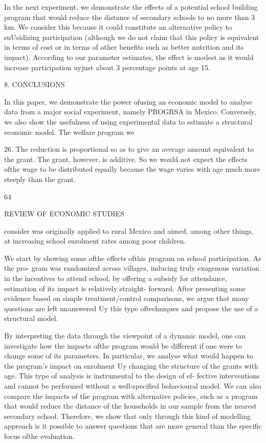 In the next experiment, we demonstrate the effects of a potential school building program that would reduce the distance of secondary schools to no more than 3 km. We consider this because it could constitute an alternative policy to suUsidizing participation (although we do not claim that this policy is equivalent in terms of cost or in terms of other benefits such as better nutrition and its impact). According to our parameter estimates, the effect is modest as it would increase participation uyjust about 3 percentage points at age 15.

8. CONCLUSIONS

In this paper, we demonstrate the power ofusing an economic model to analyse data from a major social experiment, namely PROGRSA in Mexico. Conversely, we also show the usefulness of using experimental data to estimate a structural economic model. The welfare program we

26. The reduction is proportional so as to give an average amount equivalent to the grant. The grant, however, is additive. So we would not expect the effects ofthe wage to be distributed equally because the wage varies with age much more steeply than the grant.

64

REVIEW OF ECONOMIC STUDIES

consider was originally applied to rural Mexico and aimed, among other things, at increasing school enrolment rates among poor children.

We start by showing some ofthe effects ofthis program on school participation. As the pro- gram was randomized across villages, inducing truly exogenous variation in the incentives to attend school, by offering a subsidy for attendance, estimation of its impact is relatively straight- forward. After presenting some evidence based on simple treatment/control comparisons, we argue that many questions are left unanswered Uy this type oftechniques and propose the use of a structural model.

By interpreting the data through the viewpoint of a dynamic model, one can investigate how the impacts ofthe program would be different if one were to change some of its parameters. In particular, we analyse what would happen to the program's impact on enrolment Uy changing the structure of the grants with age. This type of analysis is instrumental to the design of ef- fective interventions and cannot be performed without a well-specified behavioural model. We can also compare the impacts of the program with alternative policies, such as a program that would reduce the distance of the households in our sample from the nearest secondary school. Therefore, we show that only through this kind of modelling approach is it possible to answer questions that are more general than the specific focus ofthe evaluation.

